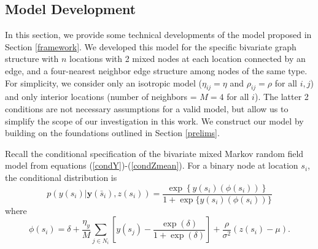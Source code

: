 \documentclass[12pt, a4paper, twoside]{article}
\begin{document}
\subsection{Model Development} \label{ModelDef}

In this section, we provide some technical developments of the model proposed in Section \ref{framework}. We developed this model for the specific bivariate graph structure with $n$ locations with 2 mixed nodes at each location connected by an edge, and a four-nearest neighbor edge structure among nodes of the same type. For simplicity, we consider only an isotropic model ($\eta_{ij} = \eta$ and $\rho_{ij} = \rho$ for all $i,j$) and only interior locations (number of neighbors = $M = 4$ for all $i$). The latter 2 conditions are not necessary assumptions for a valid model, but allow us to simplify the scope of our investigation in this work. We construct our model by building on the foundations outlined in Section \ref{prelims}.

Recall the conditional specification of the bivariate mixed Markov random field model from equations (\ref{condY})-(\ref{condZmean}).
For a binary node at location $s_i$, the conditional distribution is
\begin{equation*} \label{condY2}
p(y(s_{i})|\boldsymbol{y}(\bar{s}_i) , z(s_{i})) = \frac{\exp\left\lbrace y(s_i)\left(\phi(s_i)  \right)\right\rbrace}
{1 + \exp\lbrace y(s_i)\left(\phi(s_i) \right)\rbrace } 	
\end{equation*}
where
\begin{equation*} \label{condYmean2}
\phi(s_i) = \delta + \frac{\eta_{y}}{M} \sum_{j \in N_{i}} \left[y(s_j) - \frac{\exp(\delta)}{1+\exp(\delta)}\right] +\frac{\rho}{\sigma^2}(z(s_i) - \mu)  .
\end{equation*}
\end{document}
